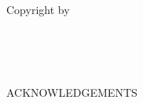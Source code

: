 \documentclass[12pt,letterpaper,twoside]{report}
\begin{document}
\thispagestyle{empty}
\mbox{}\vspace{6in}\\
\begin{flushright}
Copyright by \\
\MakeUppercase{\authorName} \\
\graduationYear \\
\end{flushright}
\newpage


\begin{centering}
\ \vfill



\vfill
\end{centering}
\newpage


\begin{centering}
\vspace{5ex}
ACKNOWLEDGEMENTS \par
\end{centering}
\vspace{\baselineskip}

\begin{doublespace}



\end{doublespace}
\newpage


\begin{singlespace}
\tableofcontents %

\newpage


\begin{singlespace}
\raggedbottom
\listoftables
\end{singlespace}


\newpage


\makeatletter
\let\l@figureOLD \l@figure
\renewcommand{\l@figure}{\vspace{\baselineskip}\l@figureOLD}
\makeatother
{}
\raggedbottom

\listoffigures

\setlength{\topmargin}{0in}
\newpage
\setlength{\parskip}{0 cm} \setlength{\topmargin}{0in}
\end{singlespace}
\end{document}
